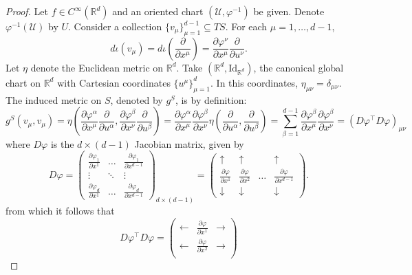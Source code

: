 \documentclass{article}
\newcommand{\p}{\partial}
\newcommand{\R}{\mathbb{R}}
\newcommand{\al}{\alpha}
\newcommand{\be}{\beta}
\newcommand{\f}[2]{\frac{#1}{#2}}
\newcommand{\lp}{\left(}
\newcommand{\rp}{\right)}
\theoremstyle{theorem}
\begin{document}
\begin{proof}
Let $f\in C^\infty(\R^d)$ and an oriented chart $(\mathcal{U}, \varphi^{-1})$ be given. Denote $\varphi^{-1}(\mathcal{U})$ by $U$. Consider a collection $\{ v_\mu \}_{\mu = 1}^{d-1}\subseteq TS$. For each $\mu = 1,\dots,d-1$,
\begin{equation*}
    d\iota(v_\mu) = d\iota\lp \f{\p}{\p x^\mu} \rp = \f{\p \varphi^\nu}{\p x^\mu} \f{\p}{\p u^\nu}.
\end{equation*}
Let $\eta$ denote the Euclidean metric on $\R^d$. Take $(\R^d, \text{Id}_{\R^d})$, the canonical global chart on $\R^d$ with Cartesian coordinates $\{ u^\mu \}_{\mu = 1}^d$. In this coordinates, $\eta_{\mu\nu} = \delta_{\mu\nu}$. The induced metric on $S$, denoted by $g^S$, is by definition:
\begin{equation*}
    g^S(v_\mu, v_\mu) = \eta\lp \f{\p \varphi^\al}{\p x^\mu} \f{\p}{\p u^\al}, \f{\p \varphi^\be}{\p x^\nu} \f{\p}{\p u^\be} \rp = \f{\p \varphi^\al}{\p x^\mu}\f{\p \varphi^\be}{\p x^\nu} \eta\lp \f{\p}{\p u^\al}, \f{\p}{\p u^\be} \rp
    = \sum_{\be = 1}^{d-1}\f{\p \varphi^\be}{\p x^\mu}\f{\p \varphi^\be}{\p x^\nu} = (D\varphi^\top D\varphi)_{\mu\nu}
\end{equation*}
where $D\varphi$ is the $d\times (d-1)$ Jacobian matrix, given by
\begin{equation*}
    D\varphi = \begin{pmatrix}
    \f{\p \varphi_1}{\p x^1} & \dots & \f{\p \varphi_1}{\p x^{d-1}} \\
    \vdots &\ddots & \vdots\\
    \f{\p \varphi_{d}}{\p x^1} & \dots & \f{\p \varphi_{d}}{\p x^{d-1}} 
    \end{pmatrix}_{d\times (d-1)} = \begin{pmatrix}
    \uparrow & \uparrow &   &\uparrow \\ 
    \f{\p \varphi}{\p x^1}& \f{\p \varphi}{\p x^2}  &\dots&\f{\p \varphi}{\p x^{d-1}}\\
    \downarrow  & \downarrow &    &\downarrow     \end{pmatrix}.
\end{equation*}
from which it follows that
\begin{equation*}
    D\varphi^\top D\varphi = \begin{pmatrix}
     \leftarrow & \f{\p \varphi}{\p x^1} & \rightarrow \\
     \leftarrow & \f{\p \varphi}{\p x^2} & \rightarrow \\

\end{pmatrix}
\end{equation*}
\end{proof}
\end{document}
